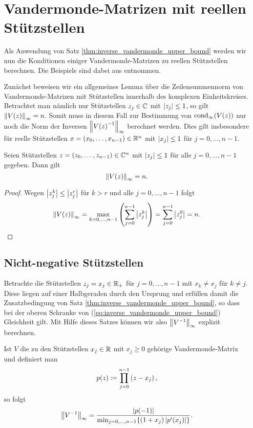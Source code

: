 
\chapter{Vandermonde-Matrizen mit reellen Stützstellen}
Als Anwendung von Satz \ref{thm:inverse_vandermonde_upper_bound} werden wir nun
die Konditionen einiger Vandermonde-Matrizen zu reellen Stützstellen berechnen.
Die Beispiele sind dabei aus \cite[S. 197-199]{gautschi1} entnommen.

Zunächst beweisen wir ein allgemeines Lemma über die Zeilensummennorm
von Vandermonde-Matrizen mit Stützstellen innerhalb des komplexen
Einheitskreises.
Betrachtet man nämlich nur Stützstellen $z_j \in \C$ mit $\abs{z_j} \leq 1$,
so gilt $\norm{\Vand{z}}_{\infty} = n$.
Somit muss in diesem Fall zur Bestimmung von $\cond[\infty]{\Vand{z}}$ nur noch die
Norm der Inversen $\norm{\Vand{z}^{-1}}_{\infty}$ berechnet werden.
Dies gilt insbesondere für reelle Stützstellen
$x = (x_0, \dots, x_{n-1}) \in \Rn$ mit $\abs{x_j} \leq 1$ für $j=0, \dots, n-1$.

\begin{lemma}
    \label{lemma:infty_norm_vandermonde_unit_roots}
    Seien Stützstellen $z = (z_0, \dots, z_{n-1}) \in \Cn$
    mit $\abs{z_j} \leq 1$ für alle\linebreak
    $j=0,\dots,n-1$ gegeben.
    Dann gilt
    \begin{equation}
        \label{eq:infty_norm_vandermonde_unit_roots}
        \norm{V(z)}_{\infty} = n.
    \end{equation}
\end{lemma}

\begin{proof}
    Wegen $\abs{z_j^k} \leq \abs{z_j^r}$ für $k > r$ und alle $j = 0, \dots, n-1$ folgt
    \[
        \norm{V(z)}_{\infty}
        = \max_{k=0,\dots,n-1} \left( \sum_{j=0}^{n-1} \abs{z_j^k} \right)
        = \sum_{j=0}^{n-1} \abs{z_j^0}
        = n.
    \]
\end{proof}

\section{Nicht-negative Stützstellen}
Betrachte die Stützstellen $z_j = x_j \in \R_+$ für $j = 0, \dots, n-1$
mit $x_k \neq x_j$ für $k \neq j$.
Diese liegen auf einer Halbgeraden durch den Ursprung und erfüllen damit die
Zusatzbedingung von Satz \ref{thm:inverse_vandermonde_upper_bound},
so dass bei der oberen Schranke von (\ref{eq:inverse_vandermonde_upper_bound})
Gleichheit gilt.
Mit Hilfe dieses Satzes können wir also $\norm{V^{-1}}_\infty$ explizit berechnen.
\begin{lemma}
    \label{lemma:nonnegative_real_nodes}
    Ist $V$ die zu den Stützstellen $x_j \in \R$ mit $x_j \geq 0$ gehörige
    Vandermonde-Matrix und definiert man
    \[
        p(z) \defeq \prod_{j=0}^{n-1} \left( z - x_j \right),
    \]
    so folgt
    \[
        \norm{V^{-1}}_{\infty} = \frac{ \abs{p(-1)}}{\min_{j=0, \dots, n-1} \{ (1+x_j) \abs{p^{\prime}(x_j)} \}}.
    \]
\end{lemma}

